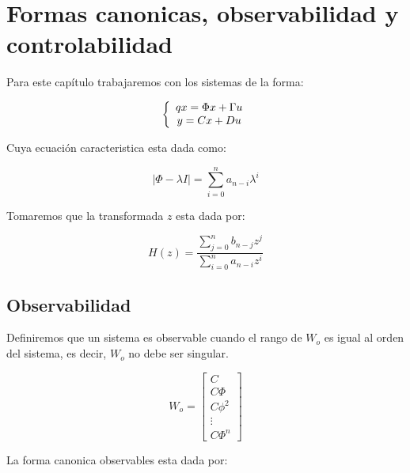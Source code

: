 \chapter{Formas canonicas, observabilidad y controlabilidad}

Para este capítulo trabajaremos con los sistemas de la forma: 

\begin{equation}
    \label{eq:sis}
    \left\{ \begin{array}{c} 
        qx = \Phi x + \Gamma u \\ 
        y = C x + D u
     \end{array} \right.
\end{equation}

Cuya ecuación caracteristica esta dada como: 

\begin{equation}
    |\Phi - \lambda I| = \sum_{i=0}^n a_{n-i} \lambda^i
\end{equation}

Tomaremos que la transformada $z$ esta dada por: 

\begin{equation}
    H(z) = \frac{\sum_{j=0}^n b_{n-j} z^j}{\sum_{i=0}^n a_{n-i} z^i}
\end{equation}

\section{Observabilidad}

Definiremos que un sistema es observable cuando el rango de $W_o$ es igual al orden del sistema, es decir, $W_o$ no debe ser singular.

\begin{equation}
    W_o = 
    \begin{bmatrix}
        C \\ C\Phi \\ C \phi^2 \\ \vdots \\ C \Phi^n
    \end{bmatrix}
\end{equation}

La forma canonica observables esta dada por: 


